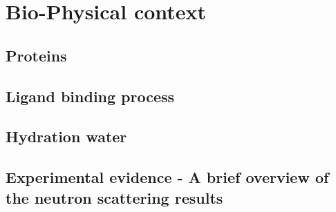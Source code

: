 \chapter{Bio-Physical context}

\section{Proteins}

\section{Ligand binding process}

\section{Hydration water}

\section{Experimental evidence - A brief overview of the neutron scattering results}
